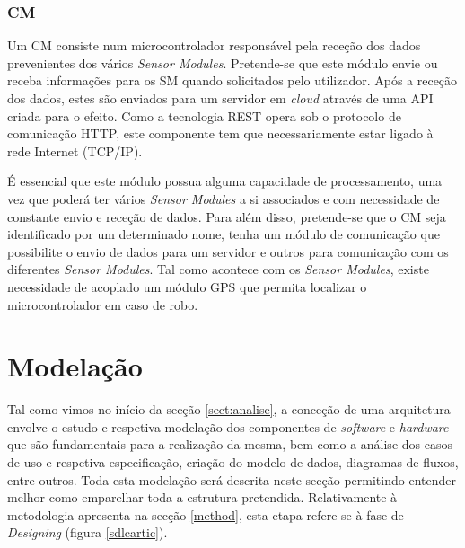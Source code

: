 \subsubsection{\acl{CM}}



Um \acl{CM} consiste num microcontrolador responsável pela receção dos dados prevenientes dos vários \textit{Sensor Modules}. Pretende-se que este módulo envie ou receba informações para os \acl{SM} quando solicitados pelo utilizador. Após a receção dos dados, estes são enviados para um servidor em \textit{cloud} através de uma \ac{API} criada para o efeito. Como a tecnologia \ac{REST} opera sob o protocolo de comunicação \ac{HTTP}, este componente tem que necessariamente estar ligado à rede Internet (\ac{TCP}/\ac{IP}). 

É essencial que este módulo possua alguma capacidade de processamento, uma vez que poderá ter vários \textit{Sensor Modules} a si associados e com necessidade de constante envio e receção de dados.  Para além disso, pretende-se que o \acl{CM} seja identificado por um determinado nome, tenha um  módulo de comunicação que possibilite o envio de dados para um servidor e outros para comunicação com os diferentes \textit{Sensor Modules}. Tal como acontece com os \textit{Sensor Modules}, existe necessidade de acoplado um módulo \ac{GPS} que permita localizar o microcontrolador em caso de robo.
 













\section{Modelação}

Tal como vimos no início da secção \ref{sect:analise}, a conceção de uma arquitetura envolve o estudo e respetiva modelação dos componentes de \textit{software} e \textit{hardware} que são fundamentais para a realização da mesma, bem como a análise dos casos de uso e respetiva especificação, criação do modelo de dados, diagramas de fluxos, entre outros. Toda esta modelação será descrita neste secção permitindo entender melhor como emparelhar toda a estrutura pretendida. Relativamente à metodologia apresenta na secção \ref{method}, esta etapa refere-se à fase de \textit{Designing} (figura \ref{sdlcartic}). 






